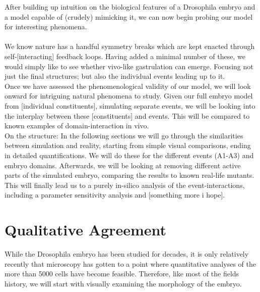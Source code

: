 After building up intuition on the biological features of a Drosophila embryo and a model capable of (crudely) mimicking it, we can now begin probing our model for interesting phenomena.\\
\\
We know nature has a handful symmetry breaks which are kept enacted through self-[interacting] feedback loops. Having added a minimal number of these, we would simply like to see whether vivo-like gastrulation can emerge. Focusing not just the final structures; but also the individual events leading up to it. \\
 
Once we have assessed the phenomenological validity of our model, we will look onward for intriguing natural phenomena to study. Given our full embryo model from [individual constituents], simulating separate events, we will be looking into the interplay between these [constituents] and events. This will be compared to known examples of domain-interaction in vivo.\reph\\


On the structure: In the following sections we will go through the similarities between simulation and reality, starting from simple visual comparisons, ending in detailed quantifications. We will do these for the different events (A1-A3) and embryo domains. Afterwards, we will be looking at removing different active parts of the simulated embryo, comparing the results to known real-life mutants. This will finally lead us to a purely in-silico analysis of the event-interactions, including a parameter sensitivity analysis and [something more i hope].\\ 

\renewcommand{\contentsname}{Results Section Table of Contents}
 \setcounter{tocdepth}{2}
\localtableofcontents
\renewcommand{\contentsname}{Table of Contents}
 \setcounter{tocdepth}{1} 


\newpage

\section{Qualitative Agreement}
While the Drosophila embryo has been studied for decades, it is only relatively recently that microscopy has gotten to a point where quantitative analyses of the more than 5000 cells have become feasible. Therefore, like most of the fields history, we will start with visually examining the morphology of the embryo. 

